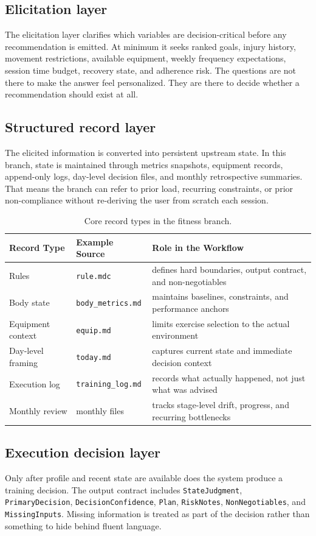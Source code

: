 \documentclass[11pt]{article}
\begin{document}
\subsection{Elicitation layer}
The elicitation layer clarifies which variables are decision-critical before any recommendation is emitted. At minimum it seeks ranked goals, injury history, movement restrictions, available equipment, weekly frequency expectations, session time budget, recovery state, and adherence risk. The questions are not there to make the answer feel personalized. They are there to decide whether a recommendation should exist at all.
\subsection{Structured record layer}
The elicited information is converted into persistent upstream state. In this branch, state is maintained through metrics snapshots, equipment records, append-only logs, day-level decision files, and monthly retrospective summaries. That means the branch can refer to prior load, recurring constraints, or prior non-compliance without re-deriving the user from scratch each session.
\begin{table}[htbp]
\centering
\begin{tabular}{p{} p{} p{}}
\toprule
Record Type & Example Source & Role in the Workflow \\
\midrule
Rules & \texttt{rule.mdc} & defines hard boundaries, output contract, and non-negotiables \\
Body state & \texttt{body\_metrics.md} & maintains baselines, constraints, and performance anchors \\
Equipment context & \texttt{equip.md} & limits exercise selection to the actual environment \\
Day-level framing & \texttt{today.md} & captures current state and immediate decision context \\
Execution log & \texttt{training\_log.md} & records what actually happened, not just what was advised \\
Monthly review & monthly files & tracks stage-level drift, progress, and recurring bottlenecks \\
\bottomrule
\end{tabular}
\caption{Core record types in the fitness branch.}
\end{table}
\subsection{Execution decision layer}
Only after profile and recent state are available does the system produce a training decision. The output contract includes \texttt{StateJudgment}, \texttt{PrimaryDecision}, \texttt{DecisionConfidence}, \texttt{Plan}, \texttt{RiskNotes}, \texttt{NonNegotiables}, and \texttt{MissingInputs}. Missing information is treated as part of the decision rather than something to hide behind fluent language.
\end{document}
